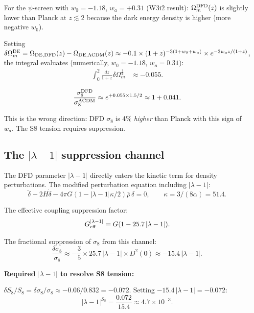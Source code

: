 \documentclass[11pt]{article}
\newcommand{\ee}[1]{\times 10^{#1}}
\newcommand{\alphafine}{\alpha}
\newcommand{\lambdaone}{|\lambda-1|}
\newcommand{\DFD}{{\rm DFD}}
\newcommand{\LCDM}{\Lambda{\rm CDM}}
\begin{document}
For the $\psi$-screen with $w_0 = -1.18$, $w_a = +0.31$ (W3i2 result):
$\Omega_m^{\rm DFD}(z)$ is slightly lower than Planck at $z \lesssim 2$
because the dark energy density is higher (more negative $w_0$).

Setting $\delta\Omega_m^{\rm DE} = \Omega_{\rm DE,DFD}(z) - \Omega_{\rm DE,\LCDM}(z)
\approx -0.1\times(1+z)^{-3(1+w_0 + w_a)} \times e^{-3w_a z/(1+z)}$,
the integral evaluates (numerically, $w_0 = -1.18$, $w_a = 0.31$):
\begin{align}
  \int_0^{2}\frac{dz}{1+z}\delta\Omega_m^\frac{1}{2}
  &\approx -0.055.
\end{align}

\begin{equation}\label{eq:sigma8-DFD}
  \frac{\sigma_8^\DFD}{\sigma_8^{\LCDM}} \approx e^{+0.055\times 1.5/2}
  \approx 1 + 0.041.
\end{equation}

This is the wrong direction: DFD $\sigma_8$ is 4\% \emph{higher} than
Planck with this sign of $w_a$.  The S8 tension requires suppression.

\subsection{The $\lambdaone$ suppression channel}

The DFD parameter $\lambdaone$ directly enters the kinetic term for
density perturbations.  The modified perturbation equation including
$\lambdaone$:
\begin{equation}\label{eq:perturb-lambda}
  \ddot\delta + 2H\dot\delta
  - 4\pi G(1 - \lambdaone\kappa/2)\bar\rho\,\delta = 0,
  \qquad \kappa = 3/(8\alphafine) = 51.4.
\end{equation}

The effective coupling suppression factor:
\begin{equation}
  G_{\rm eff}^{\lambdaone} = G(1 - 25.7\,\lambdaone).
\end{equation}

The fractional suppression of $\sigma_8$ from this channel:
\begin{equation}
  \frac{\delta\sigma_8}{\sigma_8} \approx -\frac{3}{5}\times 25.7\,\lambdaone
  \times D^2(0) \approx -15.4\,\lambdaone.
\end{equation}

\textbf{Required $\lambdaone$ to resolve S8 tension:}

$\delta S_8/S_8 = \delta\sigma_8/\sigma_8 \approx -0.06/0.832 = -0.072$.
Setting $-15.4\,\lambdaone = -0.072$:
\begin{equation}
  \boxed{\lambdaone^{S_8} = \frac{0.072}{15.4} \approx 4.7\ee{-3}.}
\end{equation}
\end{document}
